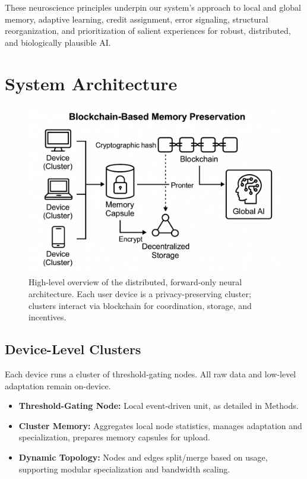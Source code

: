 \documentclass[11pt]{article}
\begin{document}
These neuroscience principles underpin our system’s approach to local and global memory, adaptive learning, credit assignment, error signaling, structural reorganization, and prioritization of salient experiences for robust, distributed, and biologically plausible AI.

\section{System Architecture}

\begin{figure}[ht]
    \centering
    \includegraphics[width=0.76\linewidth]{architecture_diagrams/6f6cd4fd-81a1-4ae3-be8c-6fd34920efe3.png}
    \caption{
        High-level overview of the distributed, forward-only neural architecture. Each user device is a privacy-preserving cluster; clusters interact via blockchain for coordination, storage, and incentives.
    }
    \label{fig:high-level-architecture}
\end{figure}

\subsection{Device-Level Clusters}

Each device runs a cluster of threshold-gating nodes. All raw data and low-level adaptation remain on-device.

\begin{itemize}
    \item \textbf{Threshold-Gating Node:} Local event-driven unit, as detailed in Methods.
    \item \textbf{Cluster Memory:} Aggregates local node statistics, manages adaptation and specialization, prepares memory capsules for upload.
    \item \textbf{Dynamic Topology:} Nodes and edges split/merge based on usage, supporting modular specialization and bandwidth scaling.
\end{itemize}
\end{document}
